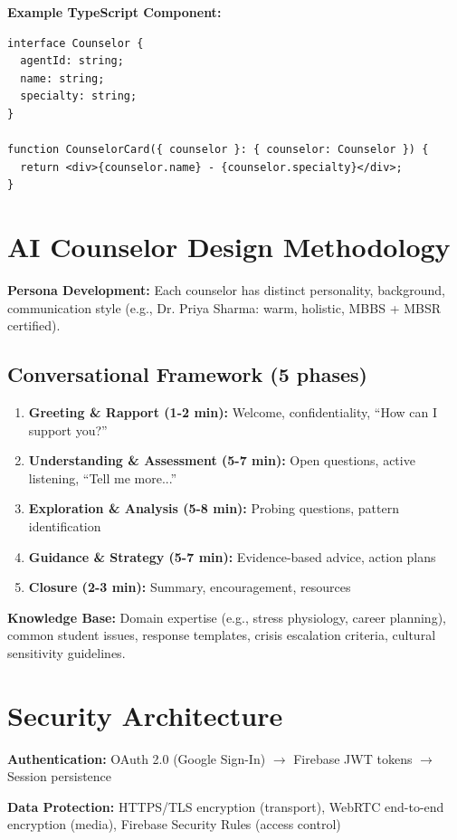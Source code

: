 \documentclass[11pt,a4paper]{report}
\begin{document}
\textbf{Example TypeScript Component:}
\begin{verbatim}
interface Counselor {
  agentId: string;
  name: string;
  specialty: string;
}

function CounselorCard({ counselor }: { counselor: Counselor }) {
  return <div>{counselor.name} - {counselor.specialty}</div>;
}
\end{verbatim}

\section{AI Counselor Design Methodology}

\textbf{Persona Development:} Each counselor has distinct personality, background, communication style (e.g., Dr. Priya Sharma: warm, holistic, MBBS + MBSR certified).

\subsection{Conversational Framework (5 phases)}
\begin{enumerate}
    \item \textbf{Greeting \& Rapport (1-2 min):} Welcome, confidentiality, ``How can I support you?''
    \item \textbf{Understanding \& Assessment (5-7 min):} Open questions, active listening, ``Tell me more...''
    \item \textbf{Exploration \& Analysis (5-8 min):} Probing questions, pattern identification
    \item \textbf{Guidance \& Strategy (5-7 min):} Evidence-based advice, action plans
    \item \textbf{Closure (2-3 min):} Summary, encouragement, resources
\end{enumerate}

\textbf{Knowledge Base:} Domain expertise (e.g., stress physiology, career planning), common student issues, response templates, crisis escalation criteria, cultural sensitivity guidelines.

\section{Security Architecture}

\textbf{Authentication:} OAuth 2.0 (Google Sign-In) $\rightarrow$ Firebase JWT tokens $\rightarrow$ Session persistence

\textbf{Data Protection:} HTTPS/TLS encryption (transport), WebRTC end-to-end encryption (media), Firebase Security Rules (access control)
\end{document}
